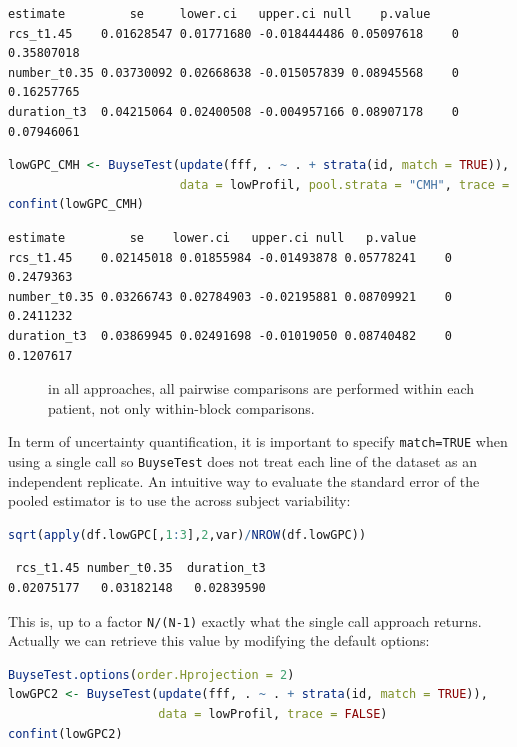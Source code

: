 \documentclass[12pt]{article}
\newcommand\Warning[1][3ex]{%
\renewcommand\stacktype{L}%
\scaleto{\stackon[1.3pt]{\color{red}$\triangle$}{\tiny\bfseries !}}{#1}%
\xspace
}
\begin{document}
\label{}
\begin{verbatim}
estimate         se     lower.ci   upper.ci null    p.value
rcs_t1.45    0.01628547 0.01771680 -0.018444486 0.05097618    0 0.35807018
number_t0.35 0.03730092 0.02668638 -0.015057839 0.08945568    0 0.16257765
duration_t3  0.04215064 0.02400508 -0.004957166 0.08907178    0 0.07946061
\end{verbatim}


\begin{lstlisting}[language=r,numbers=none]
lowGPC_CMH <- BuyseTest(update(fff, . ~ . + strata(id, match = TRUE)),
                        data = lowProfil, pool.strata = "CMH", trace = FALSE)
confint(lowGPC_CMH)
\end{lstlisting}

\label{}
\begin{verbatim}
estimate         se    lower.ci   upper.ci null   p.value
rcs_t1.45    0.02145018 0.01855984 -0.01493878 0.05778241    0 0.2479363
number_t0.35 0.03266743 0.02784903 -0.02195881 0.08709921    0 0.2411232
duration_t3  0.03869945 0.02491698 -0.01019050 0.08740482    0 0.1207617
\end{verbatim}


\begin{description}
\item[{\Warning}] in all approaches, all pairwise comparisons are performed within each patient, not only within-block comparisons.
\end{description}

In term of uncertainty quantification, it is important to specify
\texttt{match=TRUE} when using a single call so \texttt{BuyseTest} does not treat
each line of the dataset as an independent replicate. An intuitive way
to evaluate the standard error of the pooled estimator is to use the
across subject variability:
\begin{lstlisting}[language=r,numbers=none]
sqrt(apply(df.lowGPC[,1:3],2,var)/NROW(df.lowGPC))
\end{lstlisting}

\label{}
\begin{verbatim}
 rcs_t1.45 number_t0.35  duration_t3 
0.02075177   0.03182148   0.02839590
\end{verbatim}


\noindent This is, up to a factor \texttt{N/(N-1)} exactly what the single call
approach returns. Actually we can retrieve this value by modifying the default options:
\begin{lstlisting}[language=r,numbers=none]
BuyseTest.options(order.Hprojection = 2)
lowGPC2 <- BuyseTest(update(fff, . ~ . + strata(id, match = TRUE)),
                     data = lowProfil, trace = FALSE)
confint(lowGPC2)
\end{lstlisting}
\end{document}
